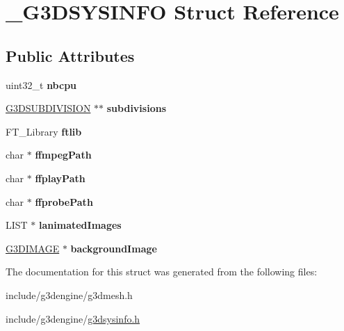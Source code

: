 \hypertarget{struct__G3DSYSINFO}{}\section{\+\_\+\+G3\+D\+S\+Y\+S\+I\+N\+FO Struct Reference}
\label{struct__G3DSYSINFO}
\subsection*{Public Attributes}
\begin{DoxyCompactItemize}
\item 
\mbox{\label{struct__G3DSYSINFO_ade21a642d67883aff1ed27174e4d6194}} 
uint32\+\_\+t {\bfseries nbcpu}
\item 
\mbox{\label{struct__G3DSYSINFO_ad9faff35c37769abb564d368aae709bd}} 
\hyperlink{structG3DSUBDIVISION}{G3\+D\+S\+U\+B\+D\+I\+V\+I\+S\+I\+ON} $\ast$$\ast$ {\bfseries subdivisions}
\item 
\mbox{\label{struct__G3DSYSINFO_a6ee88e7fd0166497ac3d018efe06a523}} 
F\+T\+\_\+\+Library {\bfseries ftlib}
\item 
\mbox{\label{struct__G3DSYSINFO_ab2cb037469583579846c5b8d852c2805}} 
char $\ast$ {\bfseries ffmpeg\+Path}
\item 
\mbox{\label{struct__G3DSYSINFO_a860378755accd748d92566b8778dc175}} 
char $\ast$ {\bfseries ffplay\+Path}
\item 
\mbox{\label{struct__G3DSYSINFO_af6954ead60431d4f01445aff476c3dd1}} 
char $\ast$ {\bfseries ffprobe\+Path}
\item 
\mbox{\label{struct__G3DSYSINFO_a669a057820805503f4be0ddaa0c3d45c}} 
L\+I\+ST $\ast$ {\bfseries lanimated\+Images}
\item 
\mbox{\label{struct__G3DSYSINFO_af4494117cad4cc21dcf9ab2be3a9b7b6}} 
\hyperlink{structG3DIMAGE}{G3\+D\+I\+M\+A\+GE} $\ast$ {\bfseries background\+Image}
\end{DoxyCompactItemize}


The documentation for this struct was generated from the following files\+:\begin{DoxyCompactItemize}
\item 
include/g3dengine/g3dmesh.\+h\item 
include/g3dengine/\hyperlink{g3dsysinfo_8h}{g3dsysinfo.\+h}\end{DoxyCompactItemize}
